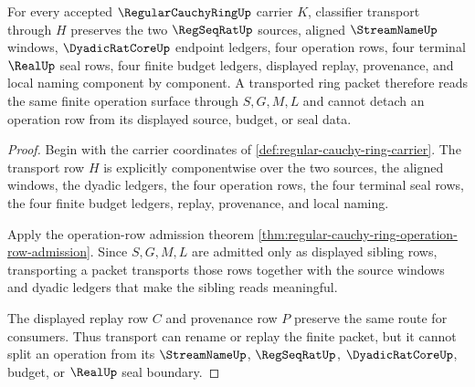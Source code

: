 \begin{theorem}
\label{thm:regular-cauchy-ring-componentwise-transport}
For every accepted $\RegularCauchyRingUp$ carrier $K$, classifier transport through $H$ preserves the two $\RegSeqRatUp$ sources, aligned $\StreamNameUp$ windows, $\DyadicRatCoreUp$ endpoint ledgers, four operation rows, four terminal $\RealUp$ seal rows, four finite budget ledgers, displayed replay, provenance, and local naming component by component. A transported ring packet therefore reads the same finite operation surface through $S,G,M,L$ and cannot detach an operation row from its displayed source, budget, or seal data.
\end{theorem}
\begin{proof}
Begin with the carrier coordinates of \autoref{def:regular-cauchy-ring-carrier}. The transport row $H$ is explicitly componentwise over the two sources, the aligned windows, the dyadic ledgers, the four operation rows, the four terminal seal rows, the four finite budget ledgers, replay, provenance, and local naming.

Apply the operation-row admission theorem \autoref{thm:regular-cauchy-ring-operation-row-admission}. Since $S,G,M,L$ are admitted only as displayed sibling rows, transporting a packet transports those rows together with the source windows and dyadic ledgers that make the sibling reads meaningful.

The displayed replay row $C$ and provenance row $P$ preserve the same route for consumers. Thus transport can rename or replay the finite packet, but it cannot split an operation from its $\StreamNameUp$, $\RegSeqRatUp$, $\DyadicRatCoreUp$, budget, or $\RealUp$ seal boundary.
\end{proof}

